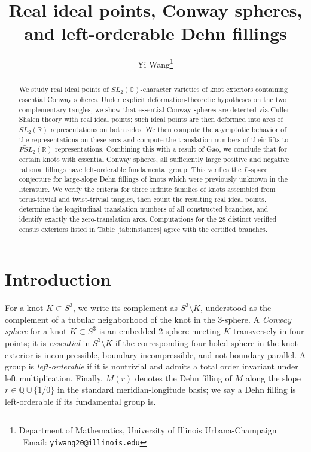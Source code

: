 \documentclass{article}
\title{Real ideal points, Conway spheres, and left-orderable Dehn fillings}
\author{Yi Wang\thanks{Department of Mathematics, University of Illinois Urbana-Champaign \ Email: \texttt{yiwang20@illinois.edu}}}
\date{}
\theoremstyle{plain}
\theoremstyle{definition}
\theoremstyle{plain}
\theoremstyle{plain}
\theoremstyle{plain}
\theoremstyle{remark}
\theoremstyle{remark}
\theoremstyle{plain}
\theoremstyle{plain}
\theoremstyle{plain}
\theoremstyle{plain}
\begin{document}
	
\maketitle

\begin{abstract}
We study real ideal points of $SL_2(\mathbb C)$-character varieties of knot exteriors containing essential Conway spheres. Under explicit deformation-theoretic hypotheses on the two complementary tangles, we show that essential Conway spheres are detected via Culler-Shalen theory with real ideal points; such ideal points are then deformed into arcs of $SL_2(\mathbb R)$ representations on both sides. We then compute the asymptotic behavior of the representations on these arcs and compute the translation numbers of their lifts to $\widetilde{PSL}_2(\mathbb R)$ representations. Combining this with a result of Gao, we conclude that for certain knots with essential Conway spheres, all sufficiently large positive and negative rational fillings have left-orderable fundamental group. This verifies the $L$-space conjecture for large-slope Dehn fillings of knots which were previously unknown in the literature. We verify the criteria for three infinite families of knots assembled from torus-trivial and twist-trivial tangles, then count the resulting real ideal points, determine the longitudinal translation numbers of all constructed branches, and identify exactly the zero-translation arcs. Computations for the $28$ distinct verified census exteriors listed in Table \ref{tab:instances} agree with the certified branches. 
\end{abstract}

\tableofcontents

\section{Introduction}\label{sec:intro}

For a knot $K \subset S^3$, we write its complement as $S^3 \setminus K$, understood as the complement of a tubular neighborhood of the knot in the 3-sphere. A \emph{Conway sphere} for a knot $K \subset S^3$ is an embedded 2-sphere meeting $K$ transversely in four points; it is \emph{essential} in $S^3 \setminus K$ if the corresponding four-holed sphere in the knot exterior is incompressible, boundary-incompressible, and not boundary-parallel. A group is \emph{left-orderable} if it is nontrivial and admits a total order invariant under left multiplication. Finally, $M(r)$ denotes the Dehn filling of $M$ along the slope $r \in \mathbb{Q} \cup \{1/0\}$ in the standard meridian-longitude basis; we say a Dehn filling is left-orderable if its fundamental group is.
\end{document}
